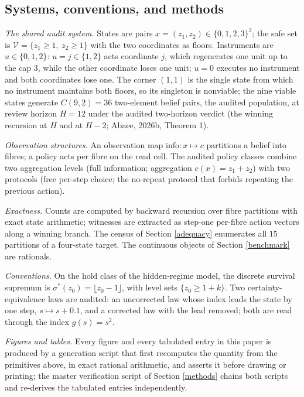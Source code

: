 \documentclass[10pt,twocolumn]{article}
\theoremstyle{definition}
\begin{document}
\subsection{Systems, conventions, and methods}\label{frame}

\emph{The shared audit system.} States are pairs
\(x = (z_1, z_2) \in \{0,1,2,3\}^{2}\); the safe set is
\(\mathcal{V} = \{z_1 \ge 1,\ z_2 \ge 1\}\) with the two coordinates as
floors. Instruments are \(u \in \{0, 1, 2\}\): \(u = j \in \{1,2\}\)
acts coordinate \(j\), which regenerates one unit up to the cap \(3\),
while the other coordinate loses one unit; \(u = 0\) executes no
instrument and both coordinates lose one. The corner \((1,1)\) is the
single state from which no instrument maintains both floors, so its
singleton is nonviable; the nine viable states generate
\(C(9,2) = 36\) two-element belief pairs, the audited population, at
review horizon \(H = 12\) under the audited two-horizon verdict (the
winning recursion at \(H\) and at \(H - 2\); Abaee, 2026b, Theorem 1).

\emph{Observation structures.} An observation map
\(\mathrm{info}: x \mapsto c\) partitions a belief into fibres; a policy
acts per fibre on the read cell. The audited policy classes combine two
aggregation levels (full information; aggregation
\(c(x) = z_1 + z_2\)) with two protocols (free per-step choice; the
no-repeat protocol that forbids repeating the previous action).

\emph{Exactness.} Counts are computed by backward recursion over fibre
partitions with exact state arithmetic; witnesses are extracted as
step-one per-fibre action vectors along a winning branch. The census of
Section \ref{adequacy} enumerates all \(15\) partitions of a four-state
target. The continuous objects of Section \ref{benchmark} are rationals.

\emph{Conventions.} On the hold class of the hidden-regime model, the
discrete survival supremum is \(\sigma^{*}(z_0) = \lfloor z_0 - 1
\rfloor\), with level sets \(\{z_0 \ge 1 + k\}\). Two
certainty-equivalence laws are audited: an uncorrected law whose index
leads the state by one step, \(s \mapsto s + 0.1\), and a corrected law
with the lead removed; both are read through the index \(g(s) = s^{2}\).

\emph{Figures and tables.} Every figure and every tabulated entry in
this paper is produced by a generation script that first recomputes the
quantity from the primitives above, in exact rational arithmetic, and
asserts it before drawing or printing; the master verification script of
Section \ref{methods} chains both scripts and re-derives the tabulated
entries independently.
\end{document}
